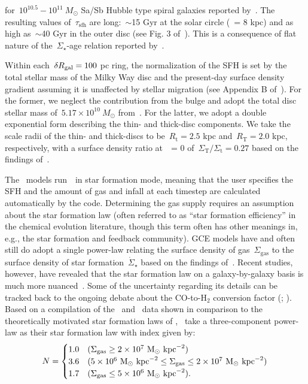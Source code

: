 \documentclass[ms.tex]{subfiles}
\begin{document}
for~$10^{10.5} - 10^{11}~M_\odot$ Sa/Sb Hubble type spiral galaxies reported
by~\citet{Sanchez2020}.
The resulting values of~$\tau_\text{sfh}$ are long:~$\sim$15 Gyr at the solar
circle (\rgal~= 8 kpc) and as high as~$\sim$40 Gyr in the outer disc (see Fig.
3 of~\citealp{Johnson2021}).
This is a consequence of flat nature of the~$\Sigma_\star$-age relation
reported by~\citet{Sanchez2020}.
\par
Within each~$\delta R_\text{gal} = 100$ pc ring, the normalization of the SFH is set by
the total stellar mass of the Milky Way disc and the present-day surface
density gradient assuming it is unaffected by stellar migration (see Appendix
B of~\citealp{Johnson2021}).
For the former, we neglect the contribution from the bulge and adopt the total
disc stellar mass of~$5.17\times10^{10}~M_\odot$ from~\citet{Licquia2015}.
For the latter, we adopt a double exponential form describing the thin- and
thick-disc components.
We take the scale radii of the thin- and thick-discs to be~$R_\text{t} = 2.5$
kpc and~$R_\text{T} = 2.0$ kpc, respectively, with a surface density ratio
at~\rgal~= 0 of~$\Sigma_\text{T} / \Sigma_\text{t} = 0.27$ based on the
findings of~\citet{Bland-Hawthorn2016}.
\par
The~\citet{Johnson2021} models run~\vice~in star formation mode, meaning that
the user specifies the SFH and the amount of gas and infall at each timestep
are calculated automatically by the code.
Determining the gas supply requires an assumption about the star formation 
law (often referred to as ``star formation efficiency'' in the chemical
evolution literature, though this term often has other meanings in, e.g., the
star formation and feedback community).
GCE models have and often still do adopt a single power-law relating the
surface density of gas~$\Sigma_\text{gas}$ to the surface density of star
formation~$\dot{\Sigma}_\star$ based on the findings of~\citet{Kennicutt1998}.
Recent studies, however, have revealed that the star formation law on a
galaxy-by-galaxy basis is much more nuanced~\citep{delosReyes2019, Ellison2021,
Kennicutt2021}.
Some of the uncertainty regarding its details can be tracked back to the
ongoing debate about the CO-to-H$_2$ conversion factor (\citealp{Kennicutt2012};
\citealp*{Liu2015}).
Based on a compilation of the~\citet{Bigiel2010} and~\citet{Leroy2013} data
shown in comparison to the theoretically motivated star formation laws of
\citet[][see their Fig. 2]{Krumholz2018},~\citet{Johnson2021} take a
three-component power-law as their star formation law with index given by:
\begin{equation}
N =
\begin{cases}
1.0 & (\Sigma_\text{gas} \geq 2\times10^7~\text{M}_\odot~\text{kpc}^{-2}) \\
3.6 & (5\times10^6~\text{M}_\odot~\text{kpc}^{-2} \leq \Sigma_\text{gas} \leq
2\times10^7~\text{M}_\odot~\text{kpc}^{-2}) \\
1.7 & (\Sigma_\text{gas} \leq 5\times10^6~\text{M}_\odot~\text{kpc}^{-2}).
\end{cases}
\end{equation}
\end{document}
